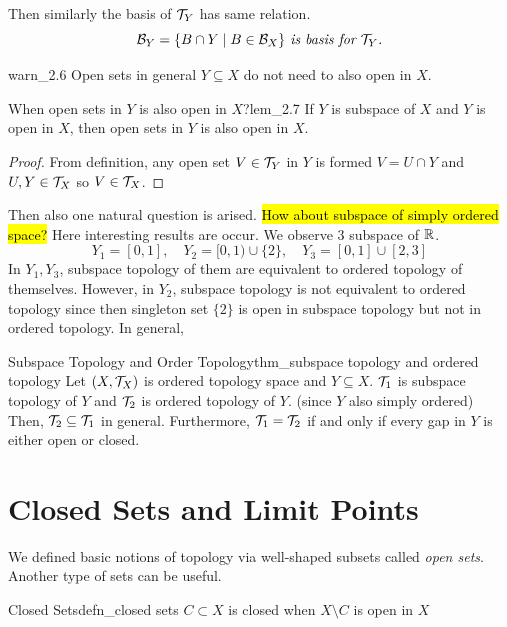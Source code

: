 \documentclass[12pt, a4paper, twoside]{article}
\theoremstyle{plain}
\begin{document}
Then similarly the basis of ${\mathcal {T}}_Y$ has same relation. 
\[\textit{${\mathcal {B}}_Y = \{B \cap Y \mid B \in {\mathcal {B}}_X\}$ is basis for ${\mathcal {T}}_Y$.}\]

\begin{warn}{}{warn_2.6}
    Open sets in general $Y \subseteq X$ do not need to also open in $X$. 
\end{warn}

\begin{lem}{When open sets in $Y$ is also open in $X$?}{lem_2.7}
    If $Y$ is subspace of $X$ and $Y$ is open in $X$, then open sets in $Y$ is also open in $X$.
\end{lem}

\begin{proof}
    From definition, any open set $V \in {\mathcal {T}}_Y$ in $Y$ is formed $V = U \cap Y$ and $U, Y \in {\mathcal {T}}_X$ so $V \in {\mathcal {T}}_X$.
\end{proof}

Then also one natural question is arised. \hl{How about subspace of simply ordered space?}
Here interesting results are occur. We observe 3 subspace of ${\mathbb {R}}$. 
\[Y_1 = [0, 1], \quad Y_2 = [0, 1) \cup \{2\}, \quad Y_3 = [0, 1] \cup [2, 3]\]
In $Y_1, Y_3$, subspace topology of them are equivalent to ordered topology of themselves. 
However, in $Y_2$, subspace topology is not equivalent to ordered topology since then singleton set $\{2\}$ is open in 
subspace topology but not in ordered topology. In general, 
\begin{thm}{Subspace Topology and Order Topology}{thm_subspace topology and ordered topology}
    Let $(X, {\mathcal {T}}_X)$ is ordered topology space and $Y \subseteq X$. ${\mathcal {T}}_1$ is subspace topology of $Y$ and ${\mathcal {T}}_2$ is ordered topology of $Y$. (since $Y$ also simply ordered)
    Then, ${\mathcal {T}}_2 \subseteq {\mathcal {T}}_1$ in general. Furthermore, ${\mathcal {T}}_1 = {\mathcal {T}}_2$ if and only if every gap in $Y$ is either open or closed. 
\end{thm}

\newpage 

\section{Closed Sets and Limit Points}

We defined basic notions of topology via well-shaped subsets called \textit{open sets}. 
Another type of sets can be useful. 

\begin{defn}{Closed Sets}{defn_closed sets}
    $C \subset X$ is closed when $X \setminus C$ is open in $X$ 
\end{defn}
\end{document}
